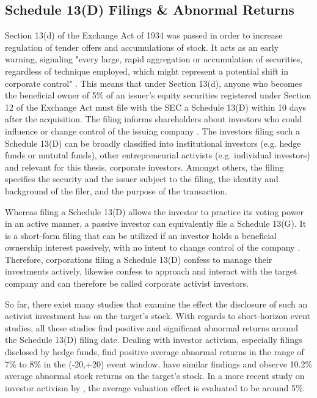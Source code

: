 \documentclass[12pt]{article}
\begin{document}
\subsection{Schedule 13(D) Filings \& Abnormal Returns}

\noindent Section 13(d) of the Exchange Act of 1934 was passed in order to increase regulation of tender offers and accumulations of stock.
It acts as an early warning, signaling "every large, rapid aggregation or accumulation of securities, regardless of technique employed, which might represent a potential shift in corporate control" \citep[p.2]{Morrison2015}. This means that under Section 13(d), anyone who becomes the beneficial owner of 5\% of an issuer's equity securities registered under Section 12 of the Exchange Act must file with the SEC a Schedule 13(D) within 10 days after the acquisition. The filing informs shareholders about investors who could influence or change control of the issuing company \citep[p.110]{Giglia2016}. The investors filing such a Schedule 13(D) can be broadly classified into institutional investors (e.g. hedge funds or mututal funds), other entrepreneurial activists (e.g. individual investors) \citep[p.188]{Klein2009} and relevant for this thesis, corporate investors. Amongst others, the filing specifies the security and the issuer subject to the filing, the identity and background of the filer, and the purpose of the transaction.\par
Whereas filing a Schedule 13(D) allows the investor to practice its voting power in an active manner, a passive investor can equivalently file a Schedule 13(G). It is a short-form filing that can be utilized if an investor holds a beneficial ownership interest passively, with no intent to change control of the company \citep{Giglia2016}. Therefore, corporations filing a Schedule 13(D) confess to manage their investments actively, likewise confess to approach and interact with the target company and can therefore be called corporate activist investors.\par
So far, there exist many studies that examine the effect the disclosure of such an activist investment has on the target's stock. With regards to short-horizon event studies, all these studies find positive and significant abnormal returns around the Schedule 13(D) filing date. 
Dealing with investor activism, especially filings disclosed by hedge funds, \citet[p.1730]{Brav2008} find positive average abnormal returns in the range of 7\% to 8\% in the (-20,+20) event window. \citet[p.188]{Klein2009} have similar findings and observe 10.2\% average abnormal stock returns on the target's stock. In a more recent study on investor activism by \citet[p.410]{Denes2017}, the average valuation effect is evaluated to be around 5\%. 
\end{document}
